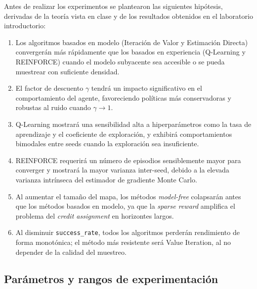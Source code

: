 \documentclass[11pt,a4paper]{article}
\begin{document}
Antes de realizar los experimentos se plantearon las siguientes hipótesis, derivadas de la teoría vista en clase y de los resultados obtenidos en el laboratorio introductorio:
\begin{enumerate}
  \item Los algoritmos basados en modelo (Iteración de Valor y Estimación Directa) convergerán más rápidamente que los basados en experiencia (Q-Learning y REINFORCE) cuando el modelo subyacente sea accesible o se pueda muestrear con suficiente densidad.
  \item El factor de descuento $\gamma$ tendrá un impacto significativo en el comportamiento del agente, favoreciendo políticas más conservadoras y robustas al ruido cuando $\gamma\to 1$.
  \item Q-Learning mostrará una sensibilidad alta a hiperparámetros como la tasa de aprendizaje y el coeficiente de exploración, y exhibirá comportamientos bimodales entre seeds cuando la exploración sea insuficiente.
  \item REINFORCE requerirá un número de episodios sensiblemente mayor para converger y mostrará la mayor varianza inter-seed, debido a la elevada varianza intrínseca del estimador de gradiente Monte Carlo.
  \item Al aumentar el tamaño del mapa, los métodos \emph{model-free} colapsarán antes que los métodos basados en modelo, ya que la \emph{sparse reward} amplifica el problema del \emph{credit assignment} en horizontes largos.
  \item Al disminuir \texttt{success\_rate}, todos los algoritmos perderán rendimiento de forma monotónica; el método más resistente será Value Iteration, al no depender de la calidad del muestreo.
\end{enumerate}

\subsection{Parámetros y rangos de experimentación}
\end{document}
